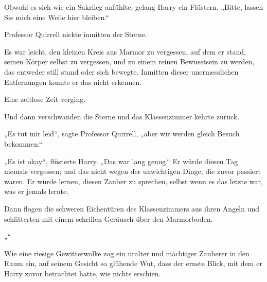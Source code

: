 Obwohl es sich wie ein Sakrileg anfühlte, gelang Harry ein Flüstern. „Bitte, lassen Sie mich eine Weile hier bleiben.“

Professor Quirrell nickte inmitten der Sterne.

Es war leicht, den kleinen Kreis aus Marmor zu vergessen, auf dem er stand, seinen Körper selbst zu vergessen, und zu einem reinen Bewusstsein zu werden, das entweder still stand oder sich bewegte. Inmitten dieser unermesslichen Entfernungen konnte er das nicht erkennen.

Eine zeitlose Zeit verging.

Und dann verschwanden die Sterne und das Klassenzimmer kehrte zurück.

„Es tut mir leid“, sagte Professor Quirrell, „aber wir werden gleich Besuch bekommen.“

„Es ist okay“, flüsterte Harry. „Das war lang genug.“ Er würde diesen Tag niemals vergessen; und das nicht wegen der unwichtigen Dinge, die zuvor passiert waren. Er würde lernen, diesen Zauber zu sprechen, selbst wenn es das letzte war, was er jemals lernte.

Dann flogen die schweren Eichentüren des Klassenzimmers aus ihren Angeln und schlitterten mit einem schrillen Geräusch über den Marmorboden.

„“

Wie eine riesige Gewitterwolke zog ein uralter und mächtiger Zauberer in den Raum ein, auf seinem Gesicht so glühende Wut, dass der ernste Blick, mit dem er Harry zuvor betrachtet hatte, wie nichts erschien.

